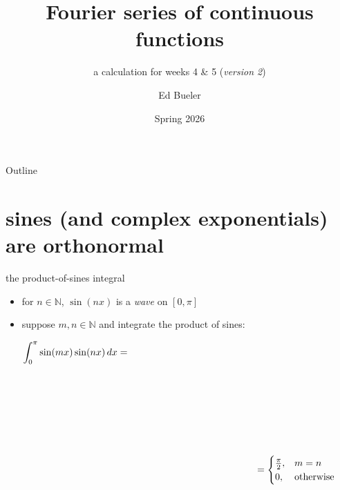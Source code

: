 \documentclass[10pt,
               svgnames,
               hyperref={colorlinks,
                         citecolor=DeepPink4,
                         linkcolor=FireBrick,
                         urlcolor=blue},
               usepdftitle=false]{beamer}
\title{Fourier series of continuous functions}
\subtitle{a calculation for weeks 4 \& 5 \quad (\emph{version 2})}
\author{Ed Bueler}
\institute[]{UAF Math 617 Functional Analysis}
\date{Spring 2026}
\newcommand{\NN}{\mathbb{N}}
\begin{document}
\beamertemplatenavigationsymbolsempty

\begin{frame}
  \maketitle
\end{frame}


\begin{frame}{Outline}
  \tableofcontents[hideallsubsections]
\end{frame}

\AtBeginSection[]
{%
}


\section{sines (and complex exponentials) are orthonormal}

\begin{frame}{the product-of-sines integral}

\begin{itemize}
\item for $n\in\NN$, $\sin(nx)$ is a \emph{wave} on $[0,\pi]$
\item suppose $m,n\in\NN$ and integrate the product of sines:
\end{itemize}
\begin{align*}
\int_0^\pi \sin(mx)\sin(nx)\,dx &= \hspace{50mm} \\
&\phantom{foo} \\
&\phantom{foo} \\
&\phantom{foo} \\
&\phantom{foo} \\
&\phantom{foo} \\
&\phantom{foo} \\
  &\hspace{50mm} = \begin{cases} \frac{\pi}{2}, & m=n \\ 0, & \text{otherwise} \end{cases}
\end{align*}

\noindent \hrulefill

\end{frame}
\end{document}
